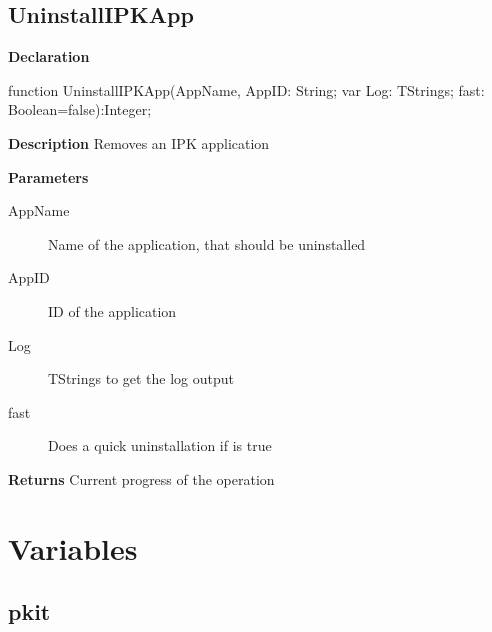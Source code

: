 \documentclass{report}
\newif\ifpdf
\begin{document}
\subsection*{UninstallIPKApp}
\fi
\label{ipkhandle-UninstallIPKApp}
\begin{list}{}{
\setlength{\itemindent}{0cm}
\setlength{\listparindent}{0cm}
\setlength{\leftmargin}{\evensidemargin}
\addtolength{\leftmargin}{\tmplength}
\settowidth{\labelsep}{X}
\addtolength{\leftmargin}{\labelsep}
\setlength{\labelwidth}{\tmplength}
}
\item[\textbf{Declaration}\hfill]
\ifpdf
\begin{flushleft}
\fi
\begin{ttfamily}
function UninstallIPKApp(AppName, AppID: String; var Log: TStrings; fast: Boolean=false):Integer;\end{ttfamily}

\ifpdf
\end{flushleft}
\fi

\par
\item[\textbf{Description}]
Removes an IPK application     \par
\item[\textbf{Parameters}]
\begin{description}
\item[AppName] Name of the application, that should be uninstalled
\item[AppID] ID of the application
\item[Log] TStrings to get the log output
\item[fast] Does a quick uninstallation if is true
\end{description}
\item[\textbf{Returns}]Current progress of the operation


\end{list}
\section{Variables}
\ifpdf
\subsection*{\large{\textbf{pkit}}\normalsize\hspace{1ex}\hrulefill}
\else
\end{document}
